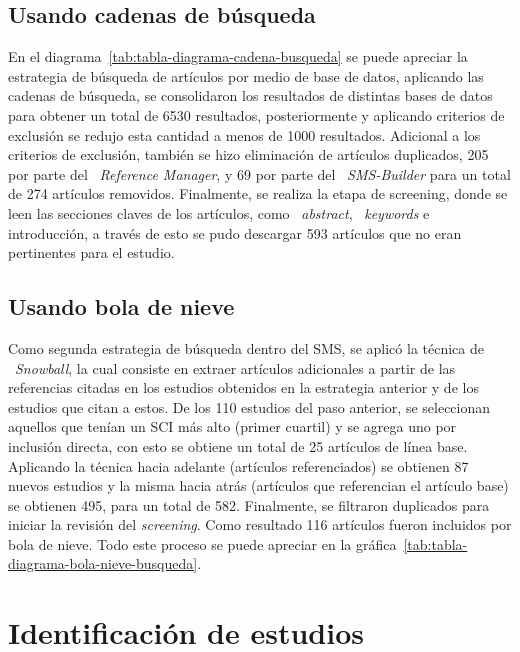 \subsection{Usando cadenas de búsqueda}
\noindent
En el diagrama~\ref{tab:tabla-diagrama-cadena-busqueda} se puede apreciar la estrategia de búsqueda de artículos por medio de base de datos, aplicando las cadenas de búsqueda, se consolidaron los resultados de distintas bases de datos para obtener un total de 6530 resultados, posteriormente y aplicando criterios de exclusión se redujo esta cantidad a menos de 1000 resultados. Adicional a los criterios de exclusión, también se hizo eliminación de artículos duplicados, 205 por parte del ~\textit{Reference Manager}, y 69 por parte del ~\textit{SMS-Builder} para un total de 274 artículos removidos. Finalmente, se realiza la etapa de screening, donde se leen las secciones claves de los artículos, como ~\textit{abstract}, ~\textit{keywords} e introducción, a través de esto se pudo descargar 593 artículos que no eran pertinentes para el estudio.
\label{img:busqueda-bd}

\subsection{Usando bola de nieve}
\noindent
Como segunda estrategia de búsqueda dentro del SMS, se aplicó la técnica de ~\textit{Snowball}, la cual consiste en extraer artículos adicionales a partir de las referencias citadas en los estudios obtenidos en la estrategia anterior y de los estudios que citan a estos. De los 110 estudios del paso anterior, se seleccionan aquellos que tenían un SCI más alto (primer cuartil) y se agrega uno por inclusión directa, con esto se obtiene un total de 25 artículos de línea base. Aplicando la técnica hacia adelante (artículos referenciados) se obtienen 87 nuevos estudios y la misma hacia atrás (artículos que referencian el artículo base) se obtienen 495, para un total de 582. Finalmente, se filtraron duplicados para iniciar la revisión del \textit{screening}. Como resultado 116 artículos fueron incluidos por bola de nieve. Todo este proceso se puede apreciar en la gráfica~\ref{tab:tabla-diagrama-bola-nieve-busqueda}.


\section{Identificación de estudios}

